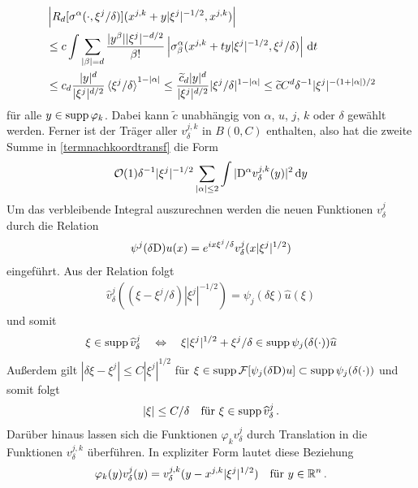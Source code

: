 \begin{align}
\begin{split}
&\left\lvert R_d[\sigma^\alpha(\cdot,\xi^j/\delta)](x^{j,k}+y|\xi^j|^{-1/2},x^{j,k})\right\rvert \\
&\le c\int \sum_{\lvert\beta\rvert=d}\frac{|y^\beta||\xi^j|^{-d/2}}{\beta!}\left\lvert\sigma^\alpha_\beta(x^{j,k}+ ty|\xi^j|^{-1/2},\xi^j/\delta) \right\rvert\,\mathrm d t\\
&\le c_d \frac{\lvert y\rvert ^d}{\lvert\xi^j\rvert^{d/2}}\braket{\xi^j/\delta}^{1-\lvert\alpha\rvert} \le\frac{\widetilde c_d\lvert y\rvert ^d}{\lvert\xi^j\rvert^{d/2}}|\xi^j/\delta|^{1-\lvert\alpha\rvert} \le \widetilde c C ^d\delta^{-1}|\xi^j|^{-(1+\lvert\alpha\rvert)/2}
\end{split}
\end{align}
für alle $y\in\operatorname{supp}\varphi_k$. Dabei kann $\widetilde c$ unabhängig von  $\alpha$, $u$, $j$, $k$ oder $\delta$ gewählt werden. Ferner ist der Träger aller $v_\delta^{j,k}$ in $B(0,C)$ enthalten, also hat die zweite Summe in \eqref{termnachkoordtransf} die Form
\begin{align}\label{restnachkoord}
\mathcal O(1) \delta^{-1}|\xi^j|^{-1/2}\sum_{\lvert\alpha\rvert\le 2}\int  |\mathrm D^\alpha v^{j,k}_\delta(y)|^2\,\mathrm d y
\end{align}
Um das verbleibende Integral auszurechnen werden die neuen Funktionen $v^j_\delta$ durch die Relation
\begin{align}
\psi^j(\delta\mathrm D)u(x) = e^{ix\xi^j/\delta}v^j_\delta(x|\xi^j|^{1/2})
\end{align}
eingeführt. Aus der Relation folgt
\begin{align}
\widehat v^j_\delta ((\xi-\xi^j/\delta)|\xi^j|^{-1/2}) = \psi_j(\delta\xi)\widehat u(\xi)
\end{align}
und somit
\begin{align}
\xi \in\operatorname{supp}\widehat v^j_\delta \quad\Leftrightarrow\quad \xi|\xi^j|^{1/2} + \xi^j/\delta\in\operatorname{supp} \psi_j(\delta(\cdot))\widehat u
\end{align}
Außerdem gilt $|\delta\xi-\xi^j|\le C|\xi^j|^{1/2}$ für $\xi\in\operatorname{supp} \mathcal F[\psi_j(\delta\mathrm D)u]\subset\operatorname{supp} \psi_j(\delta (\cdot))$ und somit folgt
\begin{align}
|\xi|\le C/\delta \quad \text{für } \xi \in\operatorname{supp}\widehat v^j_\delta\,.
\end{align}
Darüber hinaus lassen sich die Funktionen $\varphi_k v^j_\delta$ durch Translation in die Funktionen $v^{j,k}_\delta$ überführen. In expliziter Form lautet diese Beziehung
\begin{align}
\varphi_k(y) v^j_\delta (y) = v^{j,k}_\delta (y-x^{j,k}|\xi^j|^{1/2})\quad\text{für }y\in\mathbb R^n\,.
\end{align}

